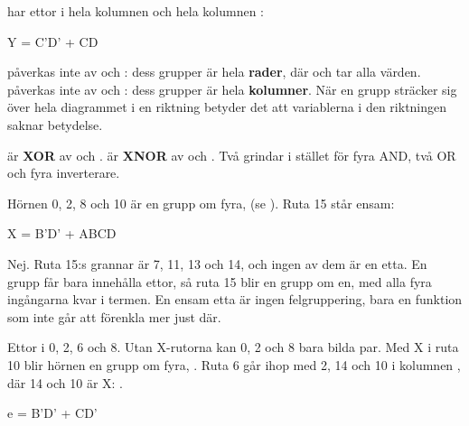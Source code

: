 \noindent{} har ettor i hela kolumnen  och hela kolumnen :

\begin{console}
Y = C'D' + CD
\end{console}

\noindent{} påverkas inte av  och : dess grupper är hela \textbf{rader}, där
 och  tar alla värden.  påverkas inte av  och : dess
grupper är hela \textbf{kolumner}. När en grupp sträcker sig över hela diagrammet i en riktning
betyder det att variablerna i den riktningen saknar betydelse.

 är \textbf{XOR} av  och .  är
\textbf{XNOR} av  och . Två grindar i stället för fyra AND, två OR och fyra
inverterare.

\leavevmode


\noindent Hörnen 0, 2, 8 och 10 är en grupp om fyra,  (se ). Ruta 15 står
ensam:

\begin{console}
X = B'D' + ABCD
\end{console}

Nej. Ruta 15:s grannar är 7, 11, 13 och 14, och ingen av dem är en etta. En grupp får bara
innehålla ettor, så ruta 15 blir en grupp om en, med alla fyra ingångarna kvar i termen. En ensam
etta är ingen felgruppering, bara en funktion som inte går att förenkla mer just där.

\leavevmode


\noindent Ettor i 0, 2, 6 och 8. Utan X-rutorna kan 0, 2 och 8 bara bilda par. Med X i ruta 10 blir
hörnen en grupp om fyra, . Ruta 6 går ihop med 2, 14 och 10 i kolumnen ,
där 14 och 10 är X: .

\begin{console}
e = B'D' + CD'
\end{console}

\leavevmode

